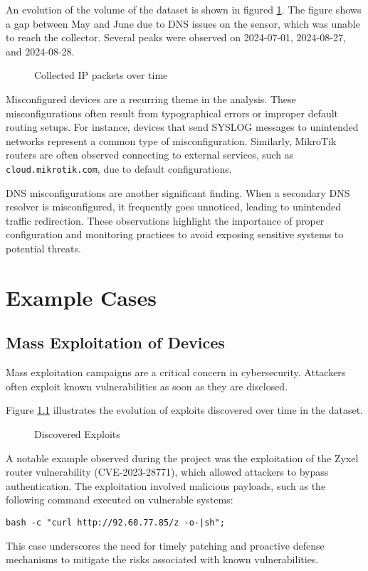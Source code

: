 An evolution of the volume of the dataset is shown in figured \ref{countedpacket}. The figure shows a gap between May and June due to DNS issues on the sensor, which was unable to reach the collector. Several peaks were observed on 2024-07-01, 2024-08-27, and 2024-08-28.

\begin{figure}
    
    \caption{Collected IP packets over time}
    \label{countedpacket}
\end{figure}

Misconfigured devices are a recurring theme in the analysis. These misconfigurations often result from typographical errors or improper default routing setups. For instance, devices that send SYSLOG messages to unintended networks represent a common type of misconfiguration. Similarly, MikroTik routers are often observed connecting to external services, such as \texttt{cloud.mikrotik.com}, due to default configurations.

DNS misconfigurations are another significant finding. When a secondary DNS resolver is misconfigured, it frequently goes unnoticed, leading to unintended traffic redirection. These observations highlight the importance of proper configuration and monitoring practices to avoid exposing sensitive systems to potential threats.

\chapter{Example Cases}
\section{Mass Exploitation of Devices}
Mass exploitation campaigns are a critical concern in cybersecurity. Attackers often exploit known vulnerabilities as soon as they are disclosed.

Figure \ref{countedexploits} illustrates the evolution of exploits discovered over time in the dataset.

\begin{figure}
    
    \caption{Discovered Exploits}
    \label{countedexploits}
\end{figure}


A notable example observed during the project was the exploitation of the Zyxel router vulnerability (CVE-2023-28771), which allowed attackers to bypass authentication. The exploitation involved malicious payloads, such as the following command executed on vulnerable systems:
\begin{verbatim}
bash -c "curl http://92.60.77.85/z -o-|sh";
\end{verbatim}
This case underscores the need for timely patching and proactive defense mechanisms to mitigate the risks associated with known vulnerabilities.

